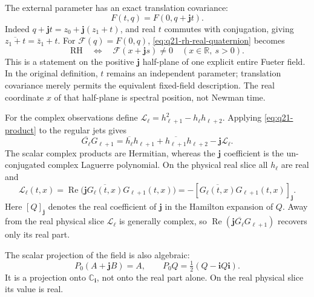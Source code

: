 \documentclass[11pt]{article}
\numberwithin{equation}{section}
\theoremstyle{definition}
\theoremstyle{remark}
\newcommand{\Lag}{\mathscr L}
\begin{document}
The external parameter has an exact translation covariance:
\begin{equation}
 F(t,q)=F(0,q+\mathbf jt).
 \label{eq:q21-time-translation}
\end{equation}
Indeed \(q+\mathbf jt=z_0+\mathbf j(z_1+t)\), and real \(t\)
commutes with conjugation, giving
\(\overline{z_1+t}=\bar z_1+t\).
For \(\mathcal F(q)=F(0,q)\),
\eqref{eq:q21-rh-real-quaternion} becomes
\begin{equation}
 \boxed{\mathrm{RH}\quad\Longleftrightarrow\quad
 \mathcal F(x+\mathbf js)\ne0
 \quad(x\in\mathbb R,\ s>0).}
 \label{eq:q21-rh-fixed-field}
\end{equation}
This is a statement on the positive \(\mathbf j\) half-plane of one
explicit entire Fueter field. In the original definition, \(t\) remains
an independent parameter; translation covariance merely permits the
equivalent fixed-field description. The real coordinate \(x\) of that
half-plane is spectral position, not Newman time.

For the complex observations define
\(\Lag_\ell=h_{\ell+1}^2-h_\ell h_{\ell+2}\).
Applying \eqref{eq:q21-product} to the regular jets gives
\begin{equation}
 \overline{G_\ell}G_{\ell+1}
 =\overline{h_\ell}h_{\ell+1}
   +\overline{h_{\ell+1}}h_{\ell+2}-\mathbf j\Lag_\ell.
 \label{eq:q21-laguerre-product}
\end{equation}
The scalar complex products are Hermitian, whereas the
\(\mathbf j\) coefficient is the un-conjugated complex Laguerre
polynomial. On the physical real slice all \(h_\ell\) are real and
\begin{equation}
 \Lag_\ell(t,x)
 =\operatorname{Re}\bigl(\mathbf j\overline{G_\ell(t,x)}G_{\ell+1}(t,x)\bigr)
 =-[\overline{G_\ell(t,x)}G_{\ell+1}(t,x)]_{\mathbf j}.
 \label{eq:q21-signed-projection}
\end{equation}
Here \([Q]_{\mathbf j}\) denotes the real coefficient of
\(\mathbf j\) in the Hamilton expansion of \(Q\).
Away from the real physical slice \(\Lag_\ell\) is generally
complex, so \(\operatorname{Re}(\mathbf j\overline{G_\ell}G_{\ell+1})\)
recovers only its real part.

The scalar projection of the field is also algebraic:
\begin{equation}
 P_0(A+\mathbf jB)=A,
 \qquad P_0Q=\tfrac12(Q-\mathbf iQ\mathbf i).
 \label{eq:q21-scalar-projection}
\end{equation}
It is a projection onto \(\mathbb C_{\mathbf i}\), not onto the real
part alone. On the real physical slice its value is real.
\end{document}
